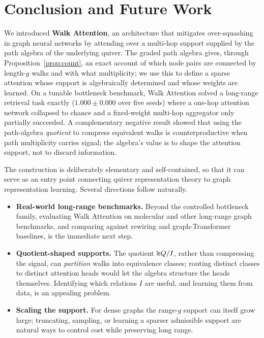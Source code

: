 \section{Conclusion and Future Work}\label{sec:conclusion}

We introduced \textbf{Walk Attention}, an architecture that mitigates
over-squashing in graph neural networks by attending over a multi-hop support
supplied by the path algebra of the underlying quiver. The graded path algebra
gives, through Proposition~\ref{prop:count}, an exact account of which node pairs
are connected by length-$g$ walks and with what multiplicity; we use this to
define a sparse attention whose support is algebraically determined and whose
weights are learned. On a tunable bottleneck benchmark, Walk Attention solved a
long-range retrieval task exactly ($1.000\pm0.000$ over five seeds) where a
one-hop attention network collapsed to chance and a fixed-weight multi-hop
aggregator only partially succeeded. A complementary negative result showed that
using the path-algebra \emph{quotient} to compress equivalent walks is
counterproductive when path multiplicity carries signal; the algebra's value is
to shape the attention support, not to discard information.

The construction is deliberately elementary and self-contained, so that it can
serve as an entry point connecting quiver representation theory to graph
representation learning. Several directions follow naturally.

\begin{itemize}
  \item \textbf{Real-world long-range benchmarks.} Beyond the controlled
  bottleneck family, evaluating Walk Attention on molecular and other long-range
  graph benchmarks, and comparing against rewiring \cite{topping2022understanding}
  and graph-Transformer baselines, is the immediate next step.
  \item \textbf{Quotient-shaped supports.} The quotient $\Bbbk Q/I$, rather than
  compressing the signal, can \emph{partition} walks into equivalence classes;
  routing distinct classes to distinct attention heads would let the algebra
  structure the heads themselves. Identifying which relations $I$ are useful, and
  learning them from data, is an appealing problem.
  \item \textbf{Scaling the support.} For dense graphs the range-$g$ support can
  itself grow large; truncating, sampling, or learning a sparser admissible
  support are natural ways to control cost while preserving long range.
\end{itemize}

